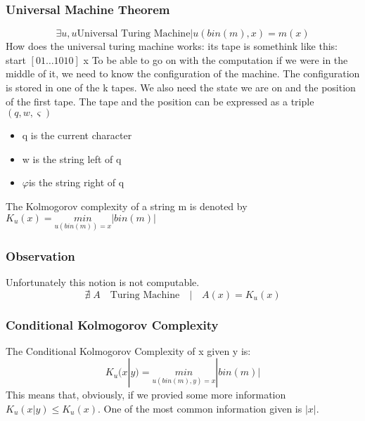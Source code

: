     \subsubsection*{Universal Machine Theorem}
    $$\exists u, u \text{Universal Turing Machine} | u(bin(m), x) = m(x)$$
    How does the universal turing machine works:
    its tape is somethink like this: start $ \left[ 01\ldots 1010 \right] $ x
    To be able to go on with the computation if we were in the middle of it, we need to know the configuration of the machine.
    The configuration is stored in one of the k tapes. We also need the state we are on and the position of the first tape.
    The tape and the position can be expressed as a triple $(q, w, \varsigma)$
    \begin{itemize}
        \item q is the current character
        \item w is the string left of q
        \item $\varphi $is the string right of q
    \end{itemize}
    The Kolmogorov complexity of a string m is denoted by $K_u(x) = \underset{u(bin(m))=x}{min}|bin(m)|$
    \subsubsection*{Observation}
    Unfortunately this notion is not computable. $$
    \nexists\; A\quad \text{Turing Machine} \quad|\quad A(x) = K_u(x)$$
    \subsubsection*{Conditional Kolmogorov Complexity}
    The Conditional Kolmogorov Complexity of x given y is:
    $$ K_u(x|y) = \underset{u(bin(m),y)=x}{min} |bin(m)| $$
    This means that, obviously, if we provied some more information $K_u(x|y) \leq K_u(x)$. One of the most common information given is $|x|$.\\
    

